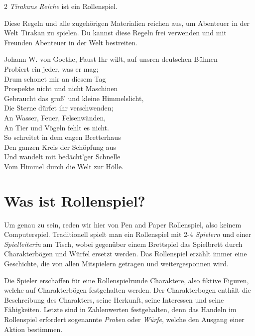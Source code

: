 \label{ch:vorwort}

\begin{multicols*}{2}
\textit{Tirakans Reiche} ist ein Rollenspiel.

Diese Regeln und alle zugehörigen Materialien reichen aus, um Abenteuer in der Welt Tirakan zu spielen.
Du kannst diese Regeln frei verwenden und mit Freunden Abenteuer in der Welt bestreiten.

\begin{pquote}{Johann W. von Goethe, Faust}
Ihr wißt, auf unsren deutschen Bühnen\\
Probiert ein jeder, was er mag;\\
Drum schonet mir an diesem Tag\\
Prospekte nicht und nicht Maschinen\\
Gebraucht das groß' und kleine Himmelslicht,\\
Die Sterne dürfet ihr verschwenden;\\
An Wasser, Feuer, Felsenwänden,\\
An Tier und Vögeln fehlt es nicht.\\
So schreitet in dem engen Bretterhaus\\
Den ganzen Kreis der Schöpfung aus\\
Und wandelt mit bedächt'ger Schnelle\\
Vom Himmel durch die Welt zur Hölle.
\end{pquote}

\section{Was ist Rollenspiel?}

Um genau zu sein, reden wir hier von Pen and Paper Rollenspiel, also keinem Computerspiel. Traditionell spielt man ein Rollenspiel mit 2-4 \textit{Spielern} und einer \textit{Spielleiterin} am Tisch, wobei gegenüber einem Brettspiel das Spielbrett durch Charakterbögen und Würfel ersetzt werden. Das Rollenspiel erzählt immer eine Geschichte, die von allen Mitspielern getragen und weitergesponnen wird.

Die Spieler erschaffen für eine Rollenspielrunde Charaktere, also fiktive Figuren, welche auf Charakterbögen festgehalten werden. Der Charakterbogen enthält die Beschreibung des Charakters, seine Herkunft, seine Interessen und seine Fähigkeiten. Letzte sind in Zahlenwerten festgehalten, denn das Handeln im Rollenspiel erfordert sogenannte \textit{Proben} oder \textit{Würfe}, welche den Ausgang einer Aktion bestimmen.


\end{multicols*}
